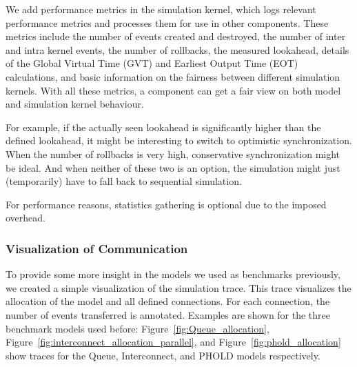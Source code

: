 We add performance metrics in the simulation kernel, which logs relevant performance metrics and processes them for use in other components.
These metrics include the number of events created and destroyed, the number of inter and intra kernel events, the number of rollbacks, the measured lookahead, details of the Global Virtual Time (GVT) and Earliest Output Time (EOT) calculations, and basic information on the fairness between different simulation kernels.
With all these metrics, a component can get a fair view on both model and simulation kernel behaviour.

For example, if the actually seen lookahead is significantly higher than the defined lookahead, it might be interesting to switch to optimistic synchronization.
When the number of rollbacks is very high, conservative synchronization might be ideal.
And when neither of these two is an option, the simulation might just (temporarily) have to fall back to sequential simulation.

For performance reasons, statistics gathering is optional due to the imposed overhead.

\subsubsection{Visualization of Communication}
To provide some more insight in the models we used as benchmarks previously, we created a simple visualization of the simulation trace.
This trace visualizes the allocation of the model and all defined connections.
For each connection, the number of events transferred is annotated.
Examples are shown for the three benchmark models used before: Figure~\ref{fig:Queue_allocation}, Figure~\ref{fig:interconnect_allocation_parallel}, and Figure~\ref{fig:phold_allocation} show traces for the Queue, Interconnect, and PHOLD models respectively.

